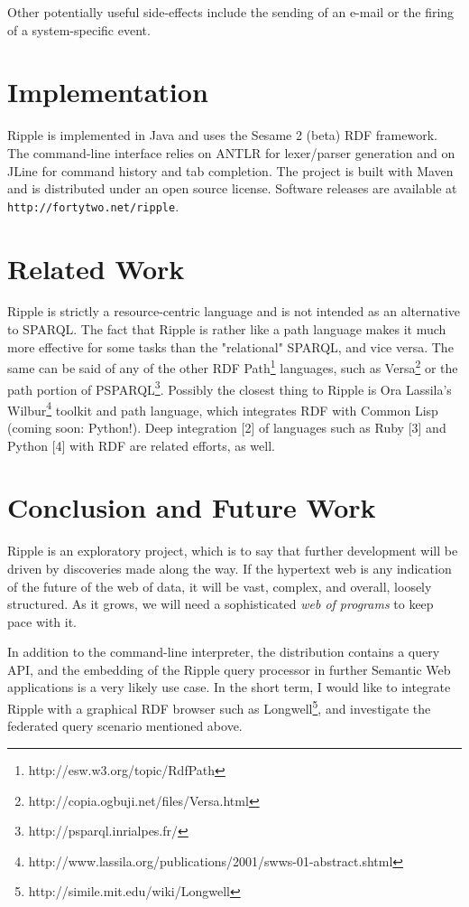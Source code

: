 \documentclass[runningheads]{llncs}
\begin{document}
Other potentially useful side-effects include the sending of an e-mail or the firing of a system-specific event.


\section{Implementation}
Ripple is implemented in Java and uses the Sesame 2 (beta) RDF framework.  The command-line interface relies on ANTLR for lexer/parser generation and on JLine for command history and tab completion.  The project is built with Maven and is distributed under an open source license.  Software releases are available at \texttt{http://fortytwo.net/ripple}.

\section{Related Work}
Ripple is strictly a resource-centric language and is not intended as an alternative to SPARQL.  The fact that Ripple is rather like a path language makes it much more effective for some tasks than the "relational" SPARQL, and vice versa.  The same can be said of any of the other RDF Path\footnote{http://esw.w3.org/topic/RdfPath} languages, such as Versa\footnote{http://copia.ogbuji.net/files/Versa.html} or the path portion of PSPARQL\footnote{http://psparql.inrialpes.fr/}.  Possibly the closest thing to Ripple is Ora Lassila's Wilbur\footnote{http://www.lassila.org/publications/2001/swws-01-abstract.shtml} toolkit and path language, which integrates RDF with Common Lisp (coming soon: Python!).  Deep integration [2] of languages such as Ruby [3] and Python [4] with RDF are related efforts, as well.

\section{Conclusion and Future Work}
Ripple is an exploratory project, which is to say that further development will be driven by discoveries made along the way.  If the hypertext web is any indication of the future of the web of data, it will be vast, complex, and overall, loosely structured.  As it grows, we will need a sophisticated \textit{web of programs} to keep pace with it.

In addition to the command-line interpreter, the distribution contains a query API, and the embedding of the Ripple query processor in further Semantic Web applications is a very likely use case.  In the short term, I would like to integrate Ripple with a graphical RDF browser such as Longwell\footnote{http://simile.mit.edu/wiki/Longwell}, and investigate the federated query scenario mentioned above.
\end{document}
